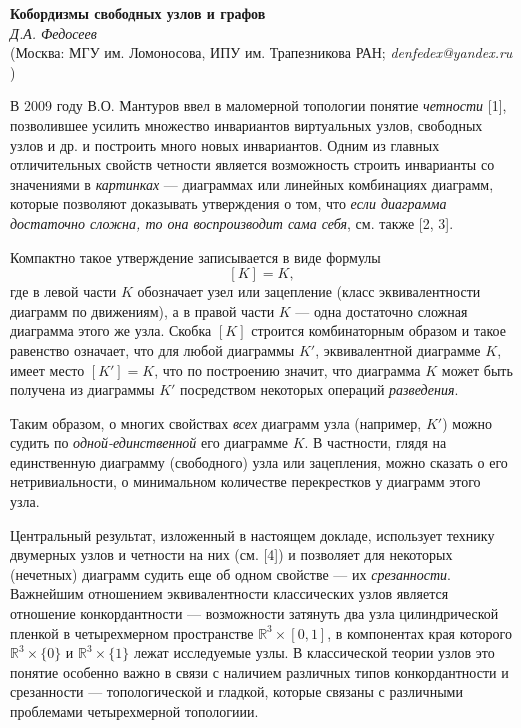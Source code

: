 \begin{center}{ \bf  Кобордизмы свободных узлов и графов}\\
{\it Д.А. Федосеев } \\
(Москва: МГУ им. Ломоносова, ИПУ им. Трапезникова РАН; {\it denfedex@yandex.ru} )
\end{center}


В 2009 году В.О. Мантуров ввел в маломерной топологии понятие {\em четности} [1], позволившее усилить множество
инвариантов виртуальных узлов, свободных узлов и др. и построить много новых инвариантов. Одним из главных отличительных свойств четности является возможность строить инварианты со значениями в {\em картинках} --- диаграммах или линейных комбинациях диаграмм, которые позволяют доказывать утверждения о том, что {\em если диаграмма достаточно сложна, то она воспроизводит сама себя}, см. также [2, 3].

Компактно такое утверждение записывается в виде формулы $$[K]=K,$$ где в левой части $K$ обозначает узел или зацепление
(класс эквивалентности диаграмм по движениям), а в правой части $K$ --- одна достаточно сложная диаграмма этого же узла. Скобка $[K]$ строится комбинаторным образом и такое равенство означает, что для любой диаграммы $K'$, эквивалентной диаграмме $K$, имеет место $[K']=K$, что по построению значит, что диаграмма $K$ может быть получена из диаграммы $K'$ посредством некоторых операций {\em разведения}.

Таким образом, о многих свойствах {\em всех} диаграмм узла (например, $K'$) можно судить по {\em одной-единственной} его диаграмме $K$. В частности, глядя на единственную диаграмму (свободного) узла или зацепления, можно сказать о его нетривиальности, о минимальном количестве перекрестков у диаграмм этого узла.

Центральный результат, изложенный в настоящем докладе, использует технику двумерных узлов и четности на них (см. [4]) и позволяет для некоторых (нечетных) диаграмм судить еще об одном свойстве --- их {\em срезанности}.
Важнейшим отношением эквивалентности классических узлов является отношение конкордантности --- возможности затянуть два узла цилиндрической пленкой в четырехмерном пространстве $\mathbb{R}^{3}\times [0,1]$, в компонентах края которого $\mathbb{R}^{3}\times \{0\}$ и $\mathbb{R}^{3}\times \{1\}$ лежат исследуемые узлы. В классической теории узлов это понятие особенно важно в связи с наличием различных типов конкордантности и срезанности --- топологической и гладкой, которые связаны с различными проблемами четырехмерной топологиии.

